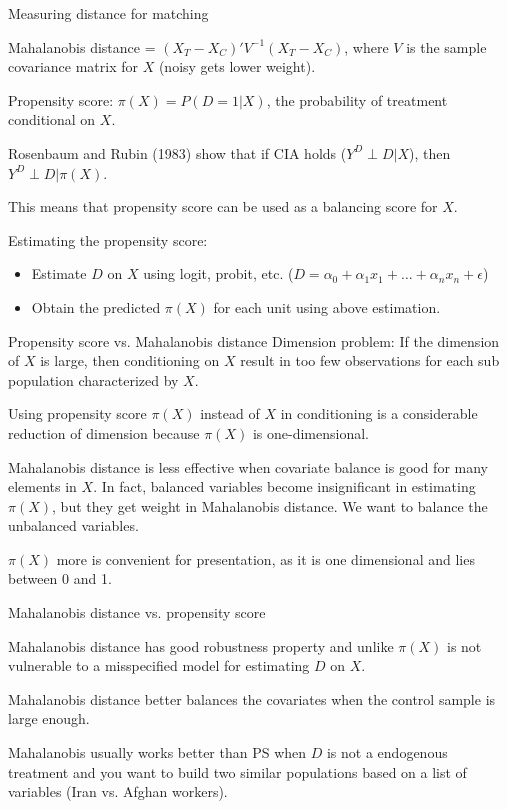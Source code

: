 \documentclass[handout]{beamer}
\begin{document}
\begin{frame}{Measuring distance for matching}
	
	{\color{violet} Mahalanobis distance = $(X_T-X_C)'V^{-1}(X_T-X_C)$}, where $V$ is the sample covariance matrix for $X$ (noisy gets lower weight). \bigskip
	
	{\color{teal} Propensity score: $\pi(X)=P(D=1|X)$}, the probability of treatment conditional on $X$.\medskip
	
	Rosenbaum and Rubin (1983) show that if CIA holds ($Y^D\perp D |X$), then  $Y^D\perp D |\pi(X)$.\medskip
	
	This means that propensity score can be used as a balancing score for $X$.\medskip
	
	Estimating the propensity score:
	\begin{itemize}
		\item Estimate $D$ on $X$ using logit, probit, etc. ($D = \alpha_0 +\alpha_1 x_1 +\dots+\alpha_n x_n+\epsilon$)
		\item Obtain the predicted $\pi(X)$ for each unit using above estimation.
	\end{itemize}
\end{frame}

\begin{frame}{Propensity score vs. Mahalanobis distance}
	Dimension problem: If the dimension of $X$ is large, then conditioning on $X$ result in too few observations for each sub population characterized by $X$.\bigskip
	
	Using propensity score $\pi(X)$ instead of $X$ in conditioning is a considerable reduction of dimension 	because $\pi(X)$ is one-dimensional.\bigskip
	
	Mahalanobis distance is less effective when covariate balance is good for many elements in $X$.	
	In fact, balanced variables become insignificant in estimating $\pi(X)$, but they get weight in Mahalanobis distance. We want to balance the unbalanced variables.\bigskip
	
	$\pi(X)$ more is convenient for presentation, as it is one dimensional and lies between 0 and 1.
	
	
\end{frame}

\begin{frame}{Mahalanobis distance vs. propensity score}

	Mahalanobis distance has good robustness property and unlike $\pi(X)$ is not vulnerable to a misspecified model for estimating $D$ on $X$.\bigskip 
	
	Mahalanobis distance better balances the covariates when the control sample is large enough.\bigskip
	
	Mahalanobis usually works better than PS when $D$ is not a endogenous treatment and you want to build two similar populations based on a list of variables (Iran vs. Afghan workers). 
	
\end{frame}
\end{document}
